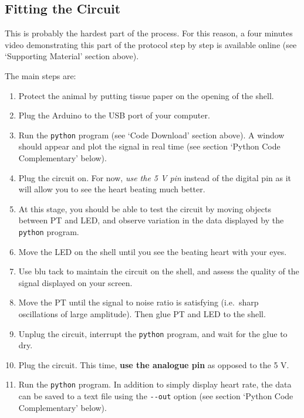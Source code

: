 \documentclass[]{article}
\begin{document}
\subsection{Fitting the Circuit}\label{fitting-the-circuit}

This is probably the hardest part of the process. For this reason, a
four minutes video demonstrating this part of the protocol step by step
is available online (see `Supporting Material' section above).

The main steps are:

\begin{enumerate}
\def\labelenumi{\arabic{enumi}.}
\itemsep1pt\parskip0pt
\item
  Protect the animal by putting tissue paper on the opening of the
  shell.
\item
  Plug the Arduino to the USB port of your computer.
\item
  Run the \texttt{python} program (see `Code Download' section above). A
  window should appear and plot the signal in real time (see section
  `Python Code Complementary' below).
\item
  Plug the circuit on. For now, \emph{use the 5 V pin} instead of the
  digital pin as it will allow you to see the heart beating much better.
\item
  At this stage, you should be able to test the circuit by moving
  objects between PT and LED, and observe variation in the data
  displayed by the \texttt{python} program.
\item
  Move the LED on the shell until you see the beating heart with your
  eyes.
\item
  Use blu tack to maintain the circuit on the shell, and assess the
  quality of the signal displayed on your screen.
\item
  Move the PT until the signal to noise ratio is satisfying (i.e.~sharp
  oscillations of large amplitude). Then glue PT and LED to the shell.
\item
  Unplug the circuit, interrupt the \texttt{python} program, and wait
  for the glue to dry.
\item
  Plug the circuit. This time, \textbf{use the analogue pin} as opposed
  to the 5 V.
\item
  Run the \texttt{python} program. In addition to simply display heart
  rate, the data can be saved to a text file using the \texttt{-\/-out}
  option (see section `Python Code Complementary' below).
\end{enumerate}
\end{document}
